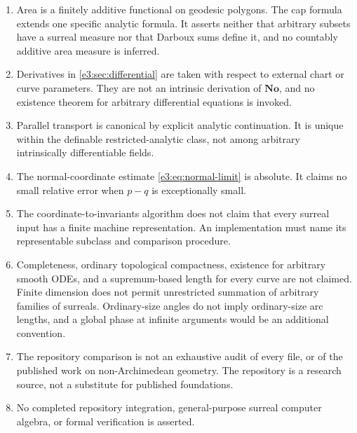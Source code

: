 \documentclass[11pt,letterpaper]{article}
\numberwithin{equation}{section}
\theoremstyle{definition}
\theoremstyle{remark}
\newcommand{\No}{\mathbf{No}}
\begin{document}
\begin{enumerate}[label=\textup{G\arabic*.},leftmargin=2.6em]
 great-circle arcs. No supremum over arbitrary partitions, no real-valued length
 metric, and no unrestricted class of nondefinable curves is introduced.
\item Area is a finitely additive functional on geodesic polygons. The cap
 formula extends one specific analytic formula. It asserts neither that
 arbitrary subsets have a surreal measure nor that Darboux sums define it, and no
 countably additive area measure is inferred.
\item Derivatives in \cref{e3:sec:differential} are taken with respect to
 external chart or curve parameters. They are not an intrinsic derivation of
 $\No$, and no existence theorem for arbitrary differential equations is
 invoked.
\item Parallel transport is canonical by explicit analytic continuation. It is
 unique within the definable restricted-analytic class, not among arbitrary
 intrinsically differentiable fields.
\item The normal-coordinate estimate \cref{e3:eq:normal-limit} is absolute. It
 claims no small relative error when $p-q$ is exceptionally small.
\item The coordinate-to-invariants algorithm does not claim that every surreal
 input has a finite machine representation. An implementation must name its
 representable subclass and comparison procedure.
\item Completeness, ordinary topological compactness, existence for arbitrary
 smooth ODEs, and a supremum-based length for every curve are not claimed. Finite
 dimension does not permit unrestricted summation of arbitrary families of
 surreals. Ordinary-size angles do not imply ordinary-size arc lengths, and a
 global phase at infinite arguments would be an additional convention.
\item The repository comparison is not an exhaustive audit of every file, or
 of the published work on non-Archimedean geometry. The repository is a
 research source, not a substitute for published foundations.
\item No completed repository integration, general-purpose surreal computer
 algebra, or formal verification is asserted.
\end{enumerate}
\end{document}
